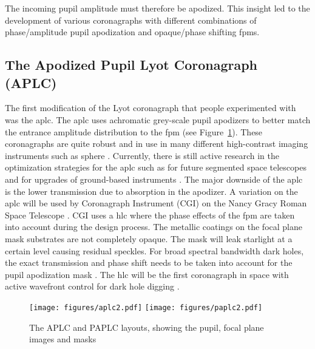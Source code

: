 \documentclass[letterpaper]{ar-1col}
\begin{document}
The incoming pupil amplitude must therefore be apodized.
%
This insight led to the development of various coronagraphs with different combinations of phase/amplitude pupil apodization and opaque/phase shifting \acp{fpm}.

\subsection{The Apodized Pupil Lyot Coronagraph (APLC)}

The first modification of the Lyot coronagraph that people experimented with was the \ac{aplc}.
%
The \ac{aplc} uses achromatic grey-scale pupil apodizers to better match the entrance amplitude distribution to the \ac{fpm} (see Figure~\ref{fig:coro_aplc}).
%
These coronagraphs are quite robust and in use in many different high-contrast imaging instruments such as \ac{sphere} \citep{beuzit2019sphere}.
%
Currently, there is still active research in the optimization strategies for the \ac{aplc} such as for future segmented space telescopes \citep{zimmerman2016lyot} and for upgrades of ground-based instruments \citep{nickson2022aplc}.
%
The major downside of the \ac{aplc} is the lower transmission due to absorption in the apodizer.
%
A variation on the \ac{aplc} will be used by Coronagraph Instrument (CGI) on the Nancy Gracy Roman Space Telescope \citep{krist2023end}.
%
CGI uses a \ac{hlc} where the phase effects of the \ac{fpm} are taken into account during the design process.
%
The metallic coatings on the focal plane mask substrates are not completely opaque.
%
The mask will leak starlight at a certain level causing residual speckles.
%
For broad spectral bandwidth dark holes, the exact transmission and phase shift needs to be taken into account for the pupil apodization mask \citep{kuchner2002coronagraph}.
%
The \ac{hlc} will be the first coronagraph in space with active wavefront control for dark hole digging \citep{krist2023end}.

\begin{figure}[ht]
  \centering
  \texttt{[image: figures/aplc2.pdf]}
  \texttt{[image: figures/paplc2.pdf]}
  \caption{The APLC and PAPLC layouts, showing the pupil, focal plane images and masks}
  \label{fig:coro_aplc}
\end{figure}
\end{document}
